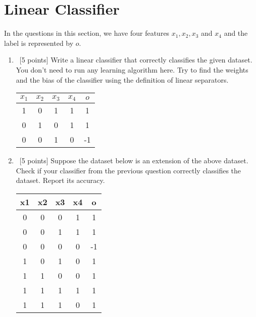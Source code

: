 \section{Linear Classifier}
\label{sec:q2}

In the questions in this section, we have four features $x_1, x_2, x_3$ and $x_4$ and the label is represented by $o$.
\begin{enumerate}
    \item~[5 points] Write a linear classifier that correctly classifies the given dataset. You don’t need to run any learning algorithm here. Try to find the weights and the bias of the classifier using the definition of linear separators.
        \begin{table}[h]
            \centering
            \begin{tabular}{cccc|c}
            $x_1$ & $x_2$ & $x_3$ & $x_4$ & $o$  \\ \hline
            1  & 0  & 1  & 1  & 1  \\
            0  & 1  & 0  & 1  & 1  \\
            0  & 0  & 1  & 0  & -1
            \end{tabular}
        \end{table}

    \item~[5 points] Suppose the dataset below is an extension of the above dataset.
        Check if your classifier from the previous question correctly classifies the dataset.
        Report its accuracy.

        \begin{table}[h]
        \centering
        \begin{tabular}{cccc|c}
            x1 & x2 & x3 & x4 & o  \\ \hline
            0  & 0  & 0  & 1  & 1  \\
            0  & 0  & 1  & 1  & 1  \\
            0  & 0  & 0  & 0  & -1 \\
            1  & 0  & 1  & 0  & 1  \\
            1  & 1  & 0  & 0  & 1  \\
            1  & 1  & 1  & 1  & 1  \\
            1  & 1  & 1  & 0  & 1  \\
        \end{tabular}
        \end{table}


\end{enumerate}
